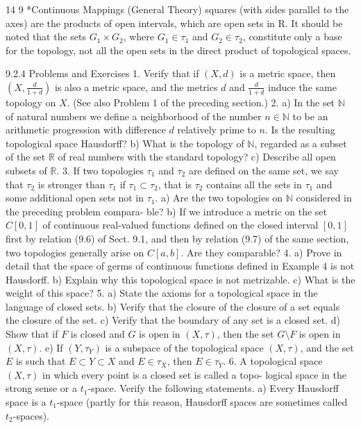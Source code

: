 14
9 *Continuous Mappings (General Theory)
squares (with sides parallel to the axes) are the products of open intervals, which are
open sets in R.
It should be noted that the sets $G_1 \times G_2$, where $G_1 \in \tau_1$ and $G_2 \in \tau_2$, constitute
only a base for the topology, not all the open sets in the direct product of topological
spaces.

9.2.4 Problems and Exercises
1. Verify that if $(X, d)$ is a metric space, then $\left(X, \frac{d}{1+d}\right)$ is also a metric space, and
the metrics $d$ and $\frac{d}{1+d}$ induce the same topology on $X$. (See also Problem 1 of the
preceding section.)
2. a) In the set $\mathbb{N}$ of natural numbers we define a neighborhood of the number
$n \in \mathbb{N}$ to be an arithmetic progression with difference $d$ relatively prime to $n$. Is the
resulting topological space Hausdorff?
b) What is the topology of $\mathbb{N}$, regarded as a subset of the set $\mathbb{R}$ of real numbers
with the standard topology?
c) Describe all open subsets of $\mathbb{R}$.
3. If two topologies $\tau_1$ and $\tau_2$ are defined on the same set, we say that $\tau_2$ is stronger
than $\tau_1$ if $\tau_1 \subset \tau_2$, that is $\tau_2$ contains all the sets in $\tau_1$ and some additional open sets
not in $\tau_1$.
a) Are the two topologies on $\mathbb{N}$ considered in the preceding problem compara-
ble?
b) If we introduce a metric on the set $C[0, 1]$ of continuous real-valued functions
defined on the closed interval $[0, 1]$ first by relation (9.6) of Sect. 9.1, and then by
relation (9.7) of the same section, two topologies generally arise on $C[a, b]$. Are
they comparable?
4. a) Prove in detail that the space of germs of continuous functions defined in
Example 4 is not Hausdorff.
b) Explain why this topological space is not metrizable.
c) What is the weight of this space?
5. a) State the axioms for a topological space in the language of closed sets.
b) Verify that the closure of the closure of a set equals the closure of the set.
c) Verify that the boundary of any set is a closed set.
d) Show that if $F$ is closed and $G$ is open in $(X, \tau)$, then the set $G \setminus F$ is open in
$(X, \tau)$.
e) If $(Y, \tau_Y)$ is a subspace of the topological space $(X, \tau)$, and the set $E$ is such
that $E \subset Y \subset X$ and $E \in \tau_X$, then $E \in \tau_Y$.
6. A topological space $(X, \tau)$ in which every point is a closed set is called a topo-
logical space in the strong sense or a $t_1$-space. Verify the following statements.
a) Every Hausdorff space is a $t_1$-space (partly for this reason, Hausdorff spaces
are sometimes called $t_2$-spaces).